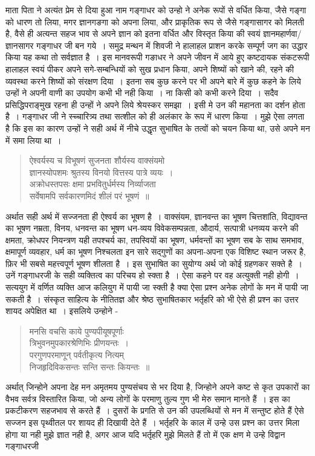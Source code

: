 {माता पिता ने अत्यंत प्रेम से दिया हुआ नाम गङ्गाधर को उन्हो ने अनेक रूपों से वर्धित किया, जैसे गङ्गा को धारण तो लिया, मगर ज्ञानगङगा को अपना लिया,  और प्राकृतिक रूप से जैसे गङ्गासागर को मिलती है, वैसे ही अत्यन्त सहज भाव से अपने ज्ञान को इतना वर्धित और विस्तृत किया की स्वयं ज्ञानमहार्णवा/ज्ञानसागर गङ्गाधर जी बन गये~। समुद्र मन्थन में शिवजी ने हालाहल प्राशन करके सम्पूर्ण जग का उद्धार किया यह कथा तो सर्वज्ञात है~। इस मानवरूपी गङाधर ने अपने जीवन में आये हुए कष्टदायक संकटरूपी हालाहल स्वयं पीकर अपने सगे-सम्बन्धियों को सुख प्रधान किया, अपने  शिष्यों को खाने की, रहने की व्यवस्था करने शिष्यों को संरक्षण दिया~। इतना सब कुछ करने पर भी अपने बारे में कुछ कहने के लिये उन्हों ने अपनी वाणी का उपयोग कभी भी नही किया~। ना किसी को कभी करने दिया~। सदैव प्रसिद्धिपराङ्मुख रहना ही उन्हों ने अपने लिये श्रेयस्कर समझा~। इसी मे  उन की महानता का दर्शन होता है~। गङ्गाधर जी ने स्च्चारित्र्य तथा सत्शील को ही अलंकार के रूप में धारण किया~। मुझे ऐसा लगता है कि इस का कारण उन्हों ने सही अर्थ में नीचे उद्धृत सुभाषित के तत्वों को चयन किया था, उसे अपने मन में समा लिया था~।
\begin{verse}
ऐश्वर्यस्य च विभूषणं सुजनता शौर्यस्य वाक्संयमो \\
ज्ञानस्योपशमः श्रुतस्य विनयो वित्तस्य पात्रे व्ययः~।\\
अक्रोधस्तपसः क्षमा प्रभवितुर्धर्मस्य निर्व्याजता \\
सर्वेषामपि सर्वकारणमिदं शीलं परं भूषणं~॥
\end{verse}
अर्थात सही अर्थ में सज्जनता ही ऐश्वर्य का भूषण है~। वाक्संयम, ज्ञानवन्त का भूषण चित्तशांति, विद्यावन्त का भूषण नम्रता, विनय, धनवन्त का भूषण धन-व्यय विवेकसम्पन्नता, औदार्य, सत्पात्री धनव्यय करने की क्षमता, क्रोधपर नियन्त्रण यही तपश्चर्य का, तपस्वियों का भूषण, धर्मवन्तों का भूषण सब के साथ समभाव, क्षमापूर्ण व्यवहार, धर्म का भूषण निश्चलता इन सारे सद्गुणों का अपना-अपना एक विशिष्ट स्थान जरूर है, फ़िर भी सबसे महत्त्वपूर्ण भूषण शीलता है~। इस सुभाषित का सुयोग्य अर्थ जो कोई ग्रहणकर सक्ते है~। उनें गङ्गाधरजी के सही व्यक्तित्व का परिचय हो स्क्ता है~। ऐसा कहने पर वह अत्युक्ती नही होगी~। सत्ययुग में वर्णित व्यक्ति आज कलियुग में पायी जा स्क्ती है क्या ऐसा प्रश्न अनेक लोगों के मन में पायी जा सकती है~। संस्कृत साहित्य के नीतितज्ञ और श्रेष्ठ सुभाषितकार भर्तृहरि को भी ऐसे ही प्रश्न का उत्तर शायद अपेक्षित था~। इसलिये उन्होने -
\begin{verse}
मनसि वचसि काये पुण्यपीयूषपूर्णाः \\
त्रिभुवनमुपकारश्रेणिभिः प्रीणयन्तः~।\\
परगुणपरमाणून् पर्वतीकृत्य नित्यम्\\
निजहृदिविकसन्तः सन्ति सन्तः कियन्तः~॥
\end{verse}
अर्थात् जिन्होने अपना देह मन अमृतमय पुण्यसंचय से भर दिया है, जिन्होने अपने कष्ट से कृत उपकारों का वैभव सर्वत्र विस्तारित किया, जो अन्य लोगों के परमाणु तुल्य गुण भी मेरु समान मानते हैं~। इस का प्रकटीकरण सहजभाव से करते हैं~। दुसरों के प्रगति से उन की उपलब्धियों से मन में सन्तुष्ट होते हैं ऐसे सज्जन इस पृथ्वीतल पर शायद ही दिखायी देते हैं~।  भर्तृहरि के काल में उन्हे उस प्रश्न का उत्तर मिला होगा या नही मुझे ज्ञात नही है, अगर आज यदि भर्तृहरि मुझे मिलते हैं  तो में एक क्षण मे उन्हे विद्वान गङ्गाधरजी 

}
